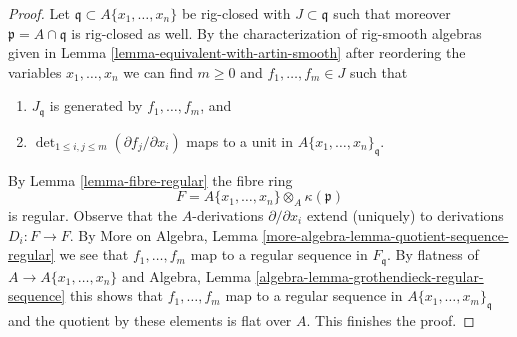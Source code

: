 \documentclass{stacks-project}
\theoremstyle{plain}
\theoremstyle{definition}
\theoremstyle{remark}
\numberwithin{equation}{subsection}
\begin{document}
\begin{proof}
\medskip\noindent
Let $\mathfrak q \subset A\{x_1, \ldots, x_n\}$ be rig-closed with
$J \subset \mathfrak q$ such that moreover $\mathfrak p = A \cap \mathfrak q$
is rig-closed as well. By the characterization of rig-smooth algebras
given in Lemma \ref{lemma-equivalent-with-artin-smooth}
after reordering the variables $x_1, \ldots, x_n$
we can find $m \geq 0$ and $f_1, \ldots, f_m \in J$ such that
\begin{enumerate}
\item $J_\mathfrak q$ is generated by $f_1, \ldots, f_m$, and
\item $\det_{1 \leq i, j \leq m}(\partial f_j/ \partial x_i)$
maps to a unit in $A\{x_1, \ldots, x_n\}_\mathfrak q$.
\end{enumerate}
By Lemma \ref{lemma-fibre-regular} the fibre ring
$$
F = A\{x_1, \ldots, x_n\} \otimes_A \kappa(\mathfrak p)
$$
is regular. Observe that the $A$-derivations $\partial / \partial x_i$
extend (uniquely) to derivations $D_i : F \to F$. By
More on Algebra, Lemma \ref{more-algebra-lemma-quotient-sequence-regular}
we see that $f_1, \ldots, f_m$ map to a regular sequence in
$F_\mathfrak q$. By flatness of $A \to A\{x_1, \ldots, x_n\}$
and Algebra, Lemma \ref{algebra-lemma-grothendieck-regular-sequence}
this shows that $f_1, \ldots, f_m$ map to a regular sequence in
$A\{x_1, \ldots, x_m\}_\mathfrak q$ and the quotient by
these elements is flat over $A$. This finishes the proof.
\end{proof}
\end{document}
